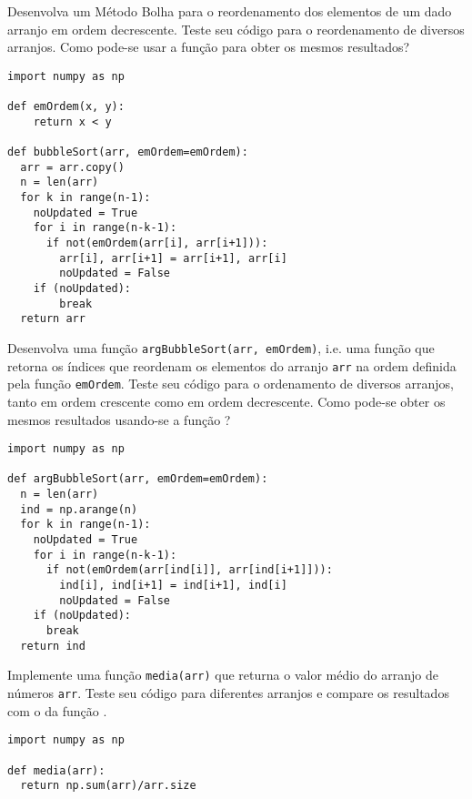 \begin{exer}
  Desenvolva um Método Bolha para o reordenamento dos elementos de um dado arranjo em ordem decrescente. Teste seu código para o reordenamento de diversos arranjos. Como pode-se usar a função {\PYTHONnumpyDOTsort} para obter os mesmos resultados?
\end{exer}
\begin{resp}

\begin{lstlisting}
import numpy as np

def emOrdem(x, y):
    return x < y

def bubbleSort(arr, emOrdem=emOrdem):
  arr = arr.copy()
  n = len(arr)
  for k in range(n-1):
    noUpdated = True
    for i in range(n-k-1):
      if not(emOrdem(arr[i], arr[i+1])):
        arr[i], arr[i+1] = arr[i+1], arr[i]
        noUpdated = False
    if (noUpdated):
        break
  return arr
\end{lstlisting}

\end{resp}

\begin{exer}
  Desenvolva uma função \lstinline+argBubbleSort(arr, emOrdem)+, i.e. uma função que retorna os índices que reordenam os elementos do arranjo \lstinline+arr+ na ordem definida pela função \lstinline+emOrdem+. Teste seu código para o ordenamento de diversos arranjos, tanto em ordem crescente como em ordem decrescente. Como pode-se obter os mesmos resultados usando-se a função {\PYTHONnumpyDOTargsort}?
\end{exer}
\begin{resp}

\begin{lstlisting}
import numpy as np

def argBubbleSort(arr, emOrdem=emOrdem):
  n = len(arr)
  ind = np.arange(n)
  for k in range(n-1):
    noUpdated = True
    for i in range(n-k-1):
      if not(emOrdem(arr[ind[i]], arr[ind[i+1]])):
        ind[i], ind[i+1] = ind[i+1], ind[i]
        noUpdated = False
    if (noUpdated):
      break
  return ind
\end{lstlisting}

\end{resp}

\begin{exer}
  Implemente uma função \lstinline+media(arr)+ que returna o valor médio do arranjo de números \lstinline+arr+. Teste seu código para diferentes arranjos e compare os resultados com o da função {\PYTHONnumpyDOTmean}.
\end{exer}
\begin{resp}

\begin{lstlisting}
import numpy as np

def media(arr):
  return np.sum(arr)/arr.size
\end{lstlisting}

\end{resp}


